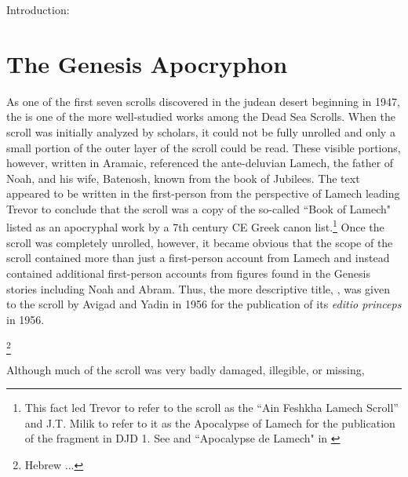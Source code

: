Introduction:


\section{The Genesis Apocryphon}

As one of the first seven scrolls discovered in the judean desert beginning in 1947, the \ga is one of the more well-studied works among the Dead Sea Scrolls. When the scroll was initially analyzed by scholars, it could not be fully unrolled and only a small portion of the outer layer of the scroll could be read. These visible portions, however, written in Aramaic, referenced the ante-deluvian Lamech, the father of Noah, and his wife, Batenosh, known from the book of Jubilees. The text appeared to be written in the first-person from the perspective of Lamech leading Trevor to conclude that the scroll was a copy of the so-called ``Book of Lamech" listed as an apocryphal work by a 7th century CE Greek canon list.\footnote{This fact led Trevor to refer to the scroll as the ``Ain Feshkha Lamech Scroll'' and J.T. Milik to refer to it as the Apocalypse of Lamech for the publication of the fragment in DJD 1. See \cite[9--10]{trevor_basor1949} and ``Apocalypse de Lamech" in \cite[86--87]{djd_1}} Once the scroll was completely unrolled, however, it became obvious that the scope of the scroll contained more than just a first-person account from Lamech and instead contained additional first-person accounts from figures found in the Genesis stories including Noah and Abram. Thus, the more descriptive title, , was given to the scroll by Avigad and Yadin in 1956 for the publication of its \emph{editio princeps} in 1956.

\footnote{Hebrew ...}



Although much of the scroll was very badly damaged, illegible, or missing, 




